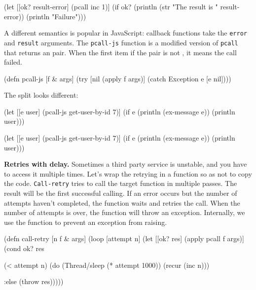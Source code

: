 \else

\begin{clojure}
(let [[ok? result-error] (pcall inc 1)]
  (if ok?
    (println (str "The result is " result-error))
    (println "Failure")))
\end{clojure}

\fi


A different semantics is popular in JavaScript: callback functions take the \verb|error| and \verb|result| arguments. The \verb|pcall-js| function is a modified version of \verb|pcall| that returns an  pair. When the first item if the pair is not , it means the call failed.

\begin{clojure}
(defn pcall-js [f & args]
  (try
    [nil (apply f args)]
    (catch Exception e [e nil])))
\end{clojure}

\noindent
The split looks different:

\ifnarrow

\begin{clojure}
(let [[e user]
      (pcall-js get-user-by-id 7)]
  (if e
    (println (ex-message e))
    (println user)))
\end{clojure}

\else

\begin{clojure}
(let [[e user] (pcall-js get-user-by-id 7)]
  (if e
    (println (ex-message e))
    (println user)))
\end{clojure}

\fi


\textbf{Retries with delay.} Sometimes a third party service is unstable, and you have to access it multiple times. Let's wrap the retrying in a function so as not to copy the code. \verb|Call-retry| tries to call the target function in multiple passes. The result will be the first successful calling. If an error occurs but the number of attempts haven't completed, the function waits and retries the call. When the number of attempts is over, the function will throw an exception. Internally, we use the  function to prevent an exception from raising.


\ifnarrow

\begin{clojure}
(defn call-retry [n f & args]
  (loop [attempt n]
    (let [[ok? res] (apply pcall f args)]
      (cond
        ok? res

        (< attempt n)
        (do (Thread/sleep
              (* attempt 1000))
            (recur (inc n)))

        :else (throw res)))))
\end{clojure}

